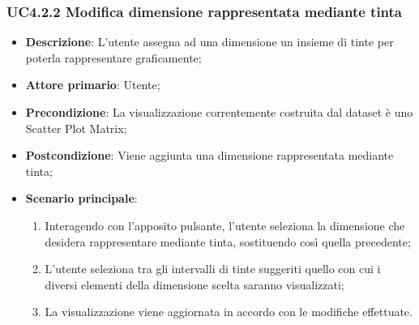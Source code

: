 \subsubsection{UC4.2.2 Modifica dimensione rappresentata mediante tinta}
\label{ssub:uc4.2.2}
\begin{itemize}
    
    \item \textbf{Descrizione}:     L'utente assegna ad una dimensione un insieme di tinte per poterla rappresentare 
                                    graficamente;
    
    \item \textbf{Attore primario}: Utente;
    \item \textbf{Precondizione}:   La visualizzazione correntemente costruita dal dataset è uno Scatter Plot Matrix;
    \item \textbf{Postcondizione}:  Viene aggiunta una dimensione rappresentata mediante tinta;
    \item \textbf{Scenario principale}:
    \begin{enumerate}
        
        \item   Interagendo con l'apposito pulsante, l'utente seleziona la dimensione che desidera rappresentare 
                mediante tinta, sostituendo così quella precedente;

        \item   L'utente seleziona tra gli intervalli di tinte suggeriti quello con cui i diversi elementi della 
                dimensione scelta saranno visualizzati;
        
        \item   La visualizzazione viene aggiornata in accordo con le modifiche effettuate.
    \end{enumerate}
\end{itemize}

